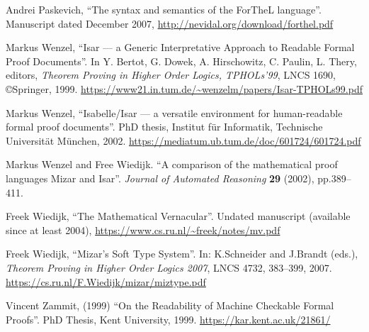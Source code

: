 \begin{enumerate}[label={[\arabic*]},left=0pt]
\item\label{paskevich-forthel} Andrei Paskevich,
  ``The syntax and semantics of the ForTheL language''.
  Manuscript dated December 2007,
  \url{http://nevidal.org/download/forthel.pdf}
\item\label{wenzel:tphols99} Markus Wenzel,
  ``Isar --- a Generic Interpretative Approach to Readable Formal Proof
  Documents''.
  In Y. Bertot, G. Dowek, A. Hirschowitz, C. Paulin, L. Thery, editors, \emph{Theorem Proving in Higher Order Logics, TPHOLs'99}, LNCS 1690, \copyright Springer, 1999.
  \url{https://www21.in.tum.de/~wenzelm/papers/Isar-TPHOLs99.pdf}
\item\label{wenzel:phd-thesis} Markus Wenzel,
  ``Isabelle/Isar --- a versatile environment for human-readable formal
  proof documents''.
  PhD thesis,
  Institut f\"ur Informatik, Technische Universit\"at M\"unchen, 2002.
  \url{https://mediatum.ub.tum.de/doc/601724/601724.pdf}
\item Markus Wenzel and Free Wiedijk.
  ``A comparison of the mathematical proof languages Mizar and Isar''.
  \emph{Journal of Automated Reasoning} \textbf{29} (2002), pp.389--411.
\item\label{wiedijk-mv} Freek Wiedijk,
  ``The Mathematical Vernacular''.
  Undated manuscript (available since at least 2004),
  \url{https://www.cs.ru.nl/~freek/notes/mv.pdf}
\item\label{wiedijk-soft-type} Freek Wiedijk,
  ``Mizar's Soft Type System''.
  In: K.Schneider and J.Brandt (eds.), \emph{Theorem Proving in Higher Order Logics 2007}, LNCS 4732, 383--399, 2007.
  \url{https://cs.ru.nl/F.Wiedijk/mizar/miztype.pdf}
\item\label{zammit:phd-thesis} Vincent Zammit,  (1999)
  ``On the Readability of Machine Checkable Formal Proofs''.
  PhD Thesis, Kent University, 1999.
  \url{https://kar.kent.ac.uk/21861/}
\end{enumerate}
